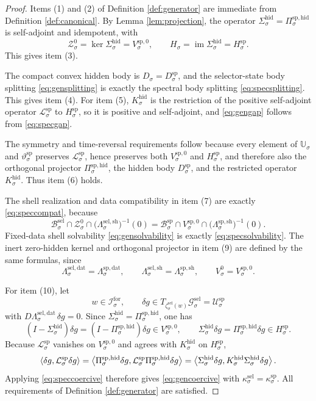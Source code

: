 \documentclass[11pt]{article}
\newcommand{\ForSpace}[1]{\mathcal I_{#1}^{\mathrm{for}}}
\newcommand{\GapSpace}[1]{H_{#1}}
\newcommand{\GapBody}[1]{D_{#1}}
\newcommand{\HiddenOperator}[1]{K_{#1}^{\mathrm{hid}}}
\newcommand{\GenSpace}[1]{\mathcal G_{#1}^{\mathrm{sel}}}
\newcommand{\GenBody}[1]{\mathcal B_{#1}^{\mathrm{sel}}}
\newcommand{\GenData}[1]{\Lambda_{#1}^{\mathrm{sel,dat}}}
\newcommand{\GenShell}[1]{\Lambda_{#1}^{\mathrm{sel,sh}}}
\newcommand{\HiddenSel}[1]{\Sigma_{#1}^{\mathrm{hid}}}
\newcommand{\ZeroHiddenSlice}[1]{\mathcal Z_{#1}^{0}}
\newcommand{\ZeroHiddenVec}[1]{V_{#1}^{0}}
\newcommand{\GenEmbed}[1]{\zeta_{#1}^{\mathrm{sel}}}
\newcommand{\SpecSpace}[1]{\mathcal U_{#1}^{\mathrm{sp}}}
\newcommand{\SpecBody}[1]{\mathcal B_{#1}^{\mathrm{sp}}}
\newcommand{\SpecData}[1]{\Lambda_{#1}^{\mathrm{sp,dat}}}
\newcommand{\SpecShell}[1]{\Lambda_{#1}^{\mathrm{sp,sh}}}
\newcommand{\SpecOp}[1]{\mathcal L_{#1}^{\mathrm{sp}}}
\newcommand{\SpecZero}[1]{V_{#1}^{\mathrm{sp},0}}
\newcommand{\SpecHidden}[1]{H_{#1}^{\mathrm{sp}}}
\newcommand{\SpecHiddenBody}[1]{D_{#1}^{\mathrm{sp}}}
\newcommand{\SpecProj}[1]{\Pi_{#1}^{\mathrm{sp,hid}}}
\newcommand{\SpecSym}[1]{\mathbb U_{#1}}
\newcommand{\SpecTime}[1]{\vartheta_{#1}^{\mathrm{sp}}}
\begin{document}
\begin{proof}
Items (1) and (2) of Definition \ref{def:generator} are immediate from Definition \ref{def:canonical}. By Lemma \ref{lem:projection}, the operator \(\HiddenSel{\sigma}=\SpecProj{\sigma}\) is self-adjoint and idempotent, with
\[
\ZeroHiddenSlice{\sigma}
=
\ker\HiddenSel{\sigma}
=
\SpecZero{\sigma},
\qquad
\GapSpace{\sigma}
=
\operatorname{im}\HiddenSel{\sigma}
=
\SpecHidden{\sigma}.
\]
This gives item (3).

The compact convex hidden body is \(\GapBody{\sigma}=\SpecHiddenBody{\sigma}\), and the selector-state body splitting \eqref{eq:gensplitting} is exactly the spectral body splitting \eqref{eq:specsplitting}. This gives item (4). For item (5), \(\HiddenOperator{\sigma}\) is the restriction of the positive self-adjoint operator \(\SpecOp{\sigma}\) to \(\SpecHidden{\sigma}\), so it is positive and self-adjoint, and \eqref{eq:gengap} follows from \eqref{eq:specgap}.

The symmetry and time-reversal requirements follow because every element of \(\SpecSym{\sigma}\) and \(\SpecTime{\sigma}\) preserves \(\SpecOp{\sigma}\), hence preserves both \(\SpecZero{\sigma}\) and \(\SpecHidden{\sigma}\), and therefore also the orthogonal projector \(\SpecProj{\sigma}\), the hidden body \(\SpecHiddenBody{\sigma}\), and the restricted operator \(\HiddenOperator{\sigma}\). Thus item (6) holds.

The shell realization and data compatibility in item (7) are exactly \eqref{eq:speccompat}, because
\[
\GenBody{\sigma}\cap\ZeroHiddenSlice{\sigma}\cap\bigl(\GenShell{\sigma}\bigr)^{-1}(0)
=
\SpecBody{\sigma}\cap\SpecZero{\sigma}\cap\bigl(\SpecShell{\sigma}\bigr)^{-1}(0).
\]
Fixed-data shell solvability \eqref{eq:gensolvability} is exactly \eqref{eq:specsolvability}. The inert zero-hidden kernel and orthogonal projector in item (9) are defined by the same formulas, since
\[
\GenData{\sigma}=\SpecData{\sigma},
\qquad
\GenShell{\sigma}=\SpecShell{\sigma},
\qquad
\ZeroHiddenVec{\sigma}=\SpecZero{\sigma}.
\]

For item (10), let
\[
w\in\ForSpace{\sigma},
\qquad
\delta g\in T_{\GenEmbed{\sigma}(w)}\GenSpace{\sigma}=\SpecSpace{\sigma}
\]
with \(D\GenData{\sigma}\,\delta g=0\). Since \(\HiddenSel{\sigma}=\SpecProj{\sigma}\), one has
\[
(I-\HiddenSel{\sigma})\delta g=(I-\SpecProj{\sigma})\delta g\in\SpecZero{\sigma},
\qquad
\HiddenSel{\sigma}\delta g=\SpecProj{\sigma}\delta g\in\SpecHidden{\sigma}.
\]
Because \(\SpecOp{\sigma}\) vanishes on \(\SpecZero{\sigma}\) and agrees with \(\HiddenOperator{\sigma}\) on \(\SpecHidden{\sigma}\),
\[
\ev{\delta g,\SpecOp{\sigma}\delta g}
=
\ev{\SpecProj{\sigma}\delta g,\SpecOp{\sigma}\SpecProj{\sigma}\delta g}
=
\ev{\HiddenSel{\sigma}\delta g,\HiddenOperator{\sigma}\HiddenSel{\sigma}\delta g}.
\]
Applying \eqref{eq:speccoercive} therefore gives \eqref{eq:gencoercive} with \(\kappa_{\sigma}^{\mathrm{sel}}=\kappa_{\sigma}^{\mathrm{sp}}\). All requirements of Definition \ref{def:generator} are satisfied.
\end{proof}
\end{document}
